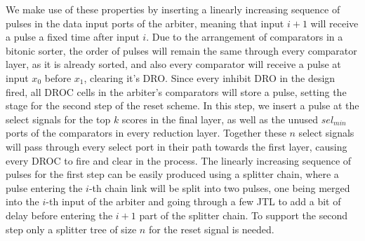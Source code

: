 \documentclass[conference]{IEEEtran}
\begin{document}
We make use of these properties by inserting a linearly increasing sequence of pulses in the data input ports of the arbiter, meaning that input $i+1$ will receive a pulse a fixed time after input $i$.
Due to the arrangement of comparators in a bitonic sorter, the order of pulses will remain the same through every comparator layer, as it is already sorted, and also every comparator will receive a pulse at input $x_0$ before $x_1$, clearing it's DRO.
Since every inhibit DRO in the design fired, all DROC cells in the arbiter's comparators will store a pulse, setting the stage for the second step of the reset scheme.
In this step, we insert a pulse at the select signals for the top $k$ scores in the final layer, as well as the unused $sel_{min}$ ports of the comparators in every reduction layer.
Together these $n$ select signals will pass through every select port in their path towards the first layer, causing every DROC to fire and clear in the process.
The linearly increasing sequence of pulses for the first step can be easily produced using a splitter chain, where a pulse entering the $i$-th chain link will be split into two pulses, one being merged into the $i$-th input of the arbiter and going through a few JTL to add a bit of delay before entering the $i+1$ part of the splitter chain.
To support the second step only a splitter tree of size $n$ for the reset signal is needed.
\end{document}
